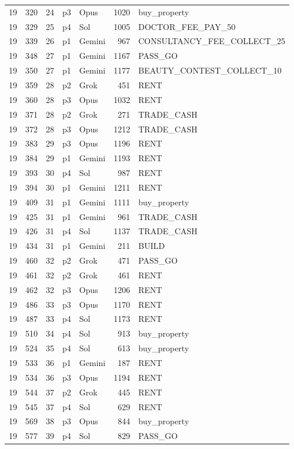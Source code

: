 \begin{longtable}{r r r l l r L{2.2in}}
19 & 320 & 24 & p3 & Opus & 1020 & buy\_property \\
19 & 329 & 25 & p4 & Sol & 1005 & DOCTOR\_FEE\_PAY\_50 \\
19 & 339 & 26 & p1 & Gemini & 967 & CONSULTANCY\_FEE\_COLLECT\_25 \\
19 & 348 & 27 & p1 & Gemini & 1167 & PASS\_GO \\
19 & 350 & 27 & p1 & Gemini & 1177 & BEAUTY\_CONTEST\_COLLECT\_10 \\
19 & 359 & 28 & p2 & Grok & 451 & RENT \\
19 & 360 & 28 & p3 & Opus & 1032 & RENT \\
19 & 371 & 28 & p2 & Grok & 271 & TRADE\_CASH \\
19 & 372 & 28 & p3 & Opus & 1212 & TRADE\_CASH \\
19 & 383 & 29 & p3 & Opus & 1196 & RENT \\
19 & 384 & 29 & p1 & Gemini & 1193 & RENT \\
19 & 393 & 30 & p4 & Sol & 987 & RENT \\
19 & 394 & 30 & p1 & Gemini & 1211 & RENT \\
19 & 409 & 31 & p1 & Gemini & 1111 & buy\_property \\
19 & 425 & 31 & p1 & Gemini & 961 & TRADE\_CASH \\
19 & 426 & 31 & p4 & Sol & 1137 & TRADE\_CASH \\
19 & 434 & 31 & p1 & Gemini & 211 & BUILD \\
19 & 460 & 32 & p2 & Grok & 471 & PASS\_GO \\
19 & 461 & 32 & p2 & Grok & 461 & RENT \\
19 & 462 & 32 & p3 & Opus & 1206 & RENT \\
19 & 486 & 33 & p3 & Opus & 1170 & RENT \\
19 & 487 & 33 & p4 & Sol & 1173 & RENT \\
19 & 510 & 34 & p4 & Sol & 913 & buy\_property \\
19 & 524 & 35 & p4 & Sol & 613 & buy\_property \\
19 & 533 & 36 & p1 & Gemini & 187 & RENT \\
19 & 534 & 36 & p3 & Opus & 1194 & RENT \\
19 & 544 & 37 & p2 & Grok & 445 & RENT \\
19 & 545 & 37 & p4 & Sol & 629 & RENT \\
19 & 569 & 38 & p3 & Opus & 844 & buy\_property \\
19 & 577 & 39 & p4 & Sol & 829 & PASS\_GO \\

\end{longtable}

